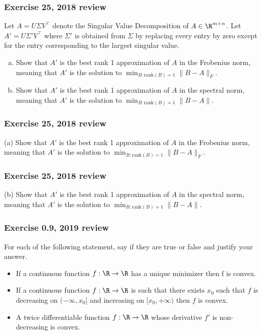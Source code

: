 \documentclass{beamer}
\begin{document}
\begin{frame}[t]
\frametitle{Exercise 25, 2018 review}
\vspace{-5pt}
Let $A = U \Sigma V^{\top}$ denote the Singular Value Decomposition of $A \in \R^{m \times n}$. Let $A' = U \Sigma' V^{\top}$ where $\Sigma'$ is obtained from $\Sigma$ by replacing every entry by zero except for the entry corresponding to the largest singular value.
\begin{enumerate}[(a)]
\item Show that $A'$ is the best rank 1 approximation of $A$ in the Frobenius norm, meaning that $A'$ is the solution to $\min_{B: \text{rank}(B)=1} \|B - A\|_F$.
\item Show that $A'$ is the best rank 1 approximation of $A$ in the spectral norm, meaning that $A'$ is the solution to $\min_{B: \text{rank}(B)=1} \|B - A\|$.
\end{enumerate}
\end{frame}

\begin{frame}[t]
\frametitle{Exercise 25, 2018 review}
\vspace{-5pt}
(a) Show that $A'$ is the best rank 1 approximation of $A$ in the Frobenius norm, meaning that $A'$ is the solution to $\min_{B: \text{rank}(B)=1} \|B - A\|_F$.
\pause
\end{frame}

\begin{frame}[t]
\frametitle{Exercise 25, 2018 review}
\vspace{-5pt}
(b) Show that $A'$ is the best rank 1 approximation of $A$ in the spectral norm, meaning that $A'$ is the solution to $\min_{B: \text{rank}(B)=1} \|B - A\|$.
\pause
\end{frame}

\begin{frame}[t]
\frametitle{Exercise 0.9, 2019 review}
\vspace{-5pt}
For each of the following statement, say if they are true or false and justify your answer.
\begin{itemize}
\item If a continuous function $f : \R \rightarrow \R$ has a unique minimizer then f is convex.
\item If a continuous function $f : \R \rightarrow \R$ is such that there exists $x_0$ such that $f$ is decreasing on
$(-\infty, x_0]$ and increasing on $[x_0, +\infty)$ then $f$ is convex.
\item A twice differentiable function $f : \R \rightarrow \R$ whose derivative $f'$ is non-decreasing is convex.
\end{itemize}
\end{frame}
\end{document}
